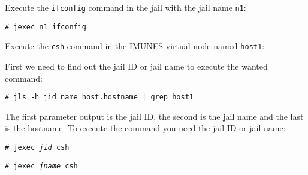 Execute the \texttt{ifconfig} command in the jail with the jail name
\texttt{n1}:

\texttt{\# jexec n1 ifconfig} \hfill

Execute the \texttt{csh} command in the IMUNES virtual node named \texttt{host1}:

First we need to find out the jail ID or jail name to execute the wanted
command:

\texttt{\# jls -h jid name host.hostname | grep host1} \hfill

The first parameter output is the jail ID, the second is the jail name and the
last is the hostname. To execute the command you need the jail ID or jail name:

\texttt{\# jexec \emph{jid} csh} \hfill

\texttt{\# jexec \emph{jname} csh} \hfill
